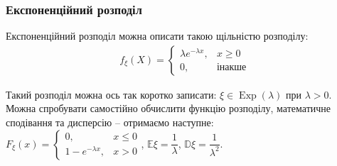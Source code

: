 \documentclass[a4paper, 10pt]{article}
\theoremstyle{theoremdd}
\DeclareMathOperator{\Exp}{Exp}
\begin{document}
\subsubsection{Експоненційний розподіл}
Експоненційний розподіл можна описати такою щільністю розподілу:
\begin{align*}
f_\xi(X) = \begin{cases} \lambda e^{-\lambda x}, & x \geq 0 \\ 0, & \text{інакше} \end{cases}
\end{align*}
\begin{figure}[H]
\centering
{}
\end{figure}
\noindent
Такий розподіл можна ось так коротко записати: $\xi \in \Exp(\lambda)$ при $\lambda >0$.\\
Можна спробувати самостійно обчислити функцію розподілу, математичне сподівання та дисперсію -- отримаємо наступне:\\
$F_\xi(x) = \begin{cases} 0, & x \leq 0 \\ 1 - e^{-\lambda x}, & x > 0 \end{cases}$, \qquad $\mathbb{E}\xi = \dfrac{1}{\lambda}$, \qquad $\mathbb{D}\xi = \dfrac{1}{\lambda^2}$.
\begin{figure}[H]
\centering
{}
\end{figure}
\end{document}
